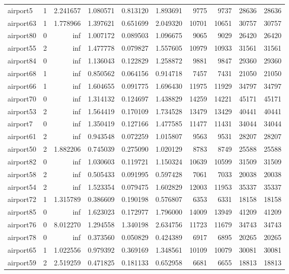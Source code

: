 \begin{longtable}{|l|r|r|r|r|r|r|r|r|r|}
airport5 & 1 & 2.241657 & 1.080571 & 0.813120 & 1.893691 & 9775 & 9737 & 28636 & 28636 \\
airport63 & 1 & 1.778966 & 1.397621 & 0.651699 & 2.049320 & 10701 & 10651 & 30757 & 30757 \\
airport80 & 0 & inf & 1.007172 & 0.089503 & 1.096675 & 9065 & 9029 & 26420 & 26420 \\
airport55 & 2 & inf & 1.477778 & 0.079827 & 1.557605 & 10979 & 10933 & 31561 & 31561 \\
airport84 & 0 & inf & 1.136043 & 0.122829 & 1.258872 & 9881 & 9847 & 29360 & 29360 \\
airport68 & 1 & inf & 0.850562 & 0.064156 & 0.914718 & 7457 & 7431 & 21050 & 21050 \\
airport66 & 1 & inf & 1.604655 & 0.091775 & 1.696430 & 11975 & 11929 & 34797 & 34797 \\
airport70 & 0 & inf & 1.314132 & 0.124697 & 1.438829 & 14259 & 14221 & 45171 & 45171 \\
airport53 & 2 & inf & 1.564419 & 0.170109 & 1.734528 & 13479 & 13429 & 40441 & 40441 \\
airport7 & 0 & inf & 1.350419 & 0.127166 & 1.477585 & 11477 & 11431 & 34044 & 34044 \\
airport61 & 2 & inf & 0.943548 & 0.072259 & 1.015807 & 9563 & 9531 & 28207 & 28207 \\
airport50 & 2 & 1.882206 & 0.745039 & 0.275090 & 1.020129 & 8783 & 8749 & 25588 & 25588 \\
airport82 & 0 & inf & 1.030603 & 0.119721 & 1.150324 & 10639 & 10599 & 31509 & 31509 \\
airport58 & 2 & inf & 0.505433 & 0.091995 & 0.597428 & 7061 & 7033 & 20038 & 20038 \\
airport54 & 2 & inf & 1.523354 & 0.079475 & 1.602829 & 12003 & 11953 & 35337 & 35337 \\
airport72 & 1 & 1.315789 & 0.386609 & 0.190198 & 0.576807 & 6353 & 6331 & 18158 & 18158 \\
airport85 & 0 & inf & 1.623023 & 0.172977 & 1.796000 & 14009 & 13949 & 41209 & 41209 \\
airport76 & 0 & 8.012270 & 1.294558 & 1.340198 & 2.634756 & 11723 & 11679 & 34743 & 34743 \\
airport78 & 0 & inf & 0.373560 & 0.050829 & 0.424389 & 6917 & 6895 & 20265 & 20265 \\
airport65 & 1 & 1.022556 & 0.979392 & 0.369169 & 1.348561 & 10109 & 10079 & 30081 & 30081 \\
airport59 & 2 & 2.519259 & 0.471825 & 0.181133 & 0.652958 & 6681 & 6655 & 18813 & 18813 \\

\end{longtable}
